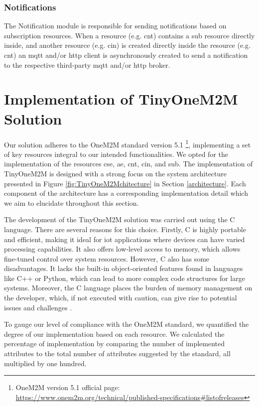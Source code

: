 \documentclass[a4paper,fleqn]{cas-dc}
\begin{document}
\subsubsection{Notifications}

The Notification module is responsible for sending notifications based on subscription resources. When a resource (e.g. \gls{cnt}) contains a \gls{sub} resource directly inside, and another resource (e.g. \gls{cin}) is created directly inside the resource (e.g. \gls{cnt}) an \gls{mqtt} and/or \gls{http} client is asynchronously created to send a notification to the respective third-party \gls{mqtt} and/or \gls{http} broker.

\section{Implementation of TinyOneM2M Solution} \label{sec:tinyonem2msolution}

Our solution adheres to the OneM2M standard version 5.1 \footnote{OneM2M version 5.1 official page: \url{https://www.onem2m.org/technical/published-specifications\#listofreleases}}, implementing a set of key resources integral to our intended functionalities. We opted for the implementation of the resources \gls{cse}, \gls{ae}, \gls{cnt}, \gls{cin}, and \gls{sub}. The implementation of TinyOneM2M is designed with a strong focus on the system architecture presented in Figure \ref{fig:TinyOneM2Mchitecture} in Section \ref{architecture}. Each component of the architecture has a corresponding implementation detail which we aim to elucidate throughout this section.

The development of the TinyOneM2M solution was carried out using the C language. There are several reasons for this choice. Firstly, C is highly portable and efficient, making it ideal for \gls{iot} applications where devices can have varied processing capabilities. It also offers low-level access to memory, which allows fine-tuned control over system resources. However, C also has some disadvantages. It lacks the built-in object-oriented features found in languages like C++ or Python, which can lead to more complex code structures for large systems. Moreover, the C language places the burden of memory management on the developer, which, if not executed with caution, can give rise to potential issues and challenges \cite{prechelt_empirical_2000}.

To gauge our level of compliance with the OneM2M standard, we quantified the degree of our implementation based on each resource. We calculated the percentage of implementation by comparing the number of implemented attributes to the total number of attributes suggested by the standard, all multiplied by one hundred.
\end{document}
